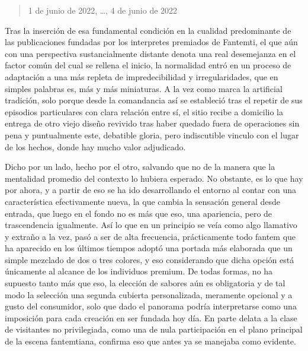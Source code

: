 \documentclass[
]{book}
\begin{document}
\begin{quote}
1 de junio de 2022, \ldots, 4 de junio de 2022
\end{quote}

Tras la inserción de esa fundamental condición en la cualidad predominante de las publicaciones fundadas por los interpretes premiados de Fantemti, el que aún con una perspectiva sustancialmente distante denota una real desemejanza en el factor común del cual se rellena el inicio, la normalidad entró en un proceso de adaptación a una más repleta de impredecibilidad y irregularidades, que en simples palabras es, más y más miniaturas. A la vez como marca la artificial tradición, solo porque desde la comandancia así se estableció tras el repetir de sus episodios particulares con clara relación entre sí, el sitio recibe a domicilio la entrega de otro viejo diseño revivido tras haber quedado fuera de operaciones sin pena y puntualmente este, debatible gloria, pero indiscutible vinculo con el lugar de los hechos, donde hay mucho valor adjudicado.

Dicho por un lado, hecho por el otro, salvando que no de la manera que la mentalidad promedio del contexto lo hubiera esperado. No obstante, es lo que hay por ahora, y a partir de eso se ha ido desarrollando el entorno al contar con una característica efectivamente nueva, la que cambia la sensación general desde entrada, que luego en el fondo no es más que eso, una apariencia, pero de trascendencia igualmente. Así lo que en un principio se veía como algo llamativo y extraño a la vez, pasó a ser de alta frecuencia, prácticamente todo fantem que ha aparecido en los últimos tiempos adoptó una portada más elaborada que un simple mezclado de dos o tres colores, y eso considerando que dicha opción está únicamente al alcance de los individuos premium. De todas formas, no ha supuesto tanto más que eso, la elección de sabores aún es obligatoria y de tal modo la selección una segunda cubierta personalizada, meramente opcional y a gusto del consumidor, solo que dado el panorama podría interpretarse como una imposición para cada creación en ser fundada hoy día. En parte delata a la clase de visitantes no privilegiada, como una de nula participación en el plano principal de la escena fantemtiana, confirma eso que antes ya se manejaba como evidente.
\end{document}
